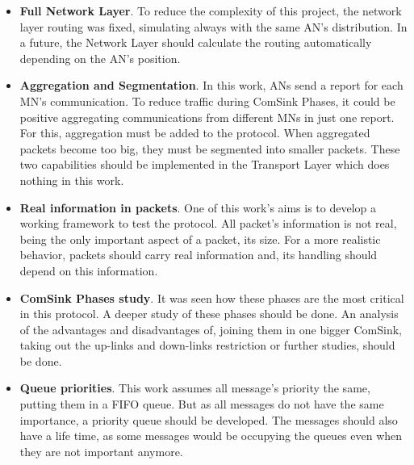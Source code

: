 \begin{itemize}
  \item \textbf{Full Network Layer}. To reduce the complexity of this project, the network layer routing was fixed, simulating always with the same
  \ac{AN}'s distribution. In a future, the Network Layer should calculate the routing automatically depending on the \ac{AN}'s position.

  \item \textbf{Aggregation and Segmentation}. In this work, \acp{AN} send a report for each \ac{MN}'s communication. To reduce traffic during
  ComSink Phases, it could be positive aggregating communications from different \acp{MN} in just one report. For this, aggregation must be added 
  to the protocol. When aggregated packets become too big, they must be segmented into smaller packets. These two capabilities should be implemented
  in the Transport Layer which does nothing in this work.

  \item \textbf{Real information in packets}. One of this work's aims is to develop a working framework to test the protocol. All packet's 
  information is not real, being the only important aspect of a packet, its size. For a more realistic behavior, packets should carry 
  real information and, its handling should depend on this information.

  \item \textbf{ComSink Phases study}. It was seen how these phases are the most critical in this protocol. A deeper study of these phases
  should be done. An analysis of the advantages and disadvantages of, joining them in one bigger ComSink, taking out the up-links and down-links 
  restriction or further studies, should be done.

  \item \textbf{Queue priorities}. This work assumes all message's priority the same, putting them in a \ac{FIFO} queue. But as all messages do 
  not have the same importance, a priority queue should be developed. The messages should also have a life time, as some messages would be occupying 
  the queues even when they are not important anymore.

\end{itemize}
